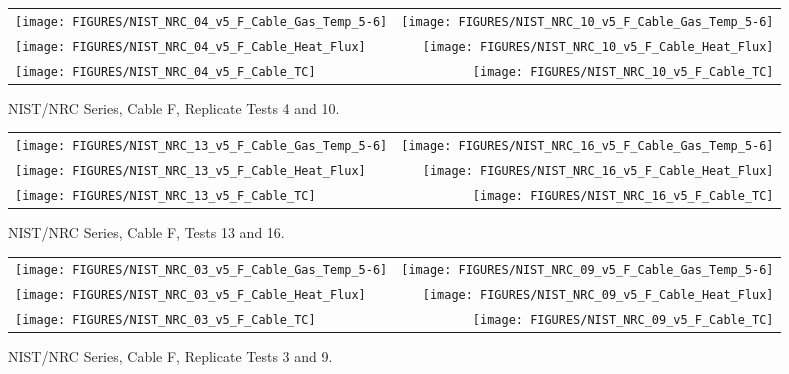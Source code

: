 \begin{figure}[h]
\begin{tabular*}{\textwidth}{l@{\extracolsep{\fill}}r}
\texttt{[image: FIGURES/NIST\_NRC\_04\_v5\_F\_Cable\_Gas\_Temp\_5-6]} &
\texttt{[image: FIGURES/NIST\_NRC\_10\_v5\_F\_Cable\_Gas\_Temp\_5-6]} \\
\texttt{[image: FIGURES/NIST\_NRC\_04\_v5\_F\_Cable\_Heat\_Flux]} &
\texttt{[image: FIGURES/NIST\_NRC\_10\_v5\_F\_Cable\_Heat\_Flux]} \\
\texttt{[image: FIGURES/NIST\_NRC\_04\_v5\_F\_Cable\_TC]} &
\texttt{[image: FIGURES/NIST\_NRC\_10\_v5\_F\_Cable\_TC]}
\end{tabular*}
\caption{NIST/NRC Series, Cable F, Replicate Tests 4 and 10.}
\label{NIST_NRC_F_4_and_10}
\end{figure}

\begin{figure}[h]
\begin{tabular*}{\textwidth}{l@{\extracolsep{\fill}}r}
\texttt{[image: FIGURES/NIST\_NRC\_13\_v5\_F\_Cable\_Gas\_Temp\_5-6]} &
\texttt{[image: FIGURES/NIST\_NRC\_16\_v5\_F\_Cable\_Gas\_Temp\_5-6]} \\
\texttt{[image: FIGURES/NIST\_NRC\_13\_v5\_F\_Cable\_Heat\_Flux]} &
\texttt{[image: FIGURES/NIST\_NRC\_16\_v5\_F\_Cable\_Heat\_Flux]} \\
\texttt{[image: FIGURES/NIST\_NRC\_13\_v5\_F\_Cable\_TC]} &
\texttt{[image: FIGURES/NIST\_NRC\_16\_v5\_F\_Cable\_TC]}
\end{tabular*}
\caption{NIST/NRC Series, Cable F, Tests 13 and 16.}
\label{NIST_NRC_F_13_and_16}
\end{figure}

\begin{figure}[h]
\begin{tabular*}{\textwidth}{l@{\extracolsep{\fill}}r}
\texttt{[image: FIGURES/NIST\_NRC\_03\_v5\_F\_Cable\_Gas\_Temp\_5-6]} &
\texttt{[image: FIGURES/NIST\_NRC\_09\_v5\_F\_Cable\_Gas\_Temp\_5-6]} \\
\texttt{[image: FIGURES/NIST\_NRC\_03\_v5\_F\_Cable\_Heat\_Flux]} &
\texttt{[image: FIGURES/NIST\_NRC\_09\_v5\_F\_Cable\_Heat\_Flux]} \\
\texttt{[image: FIGURES/NIST\_NRC\_03\_v5\_F\_Cable\_TC]} &
\texttt{[image: FIGURES/NIST\_NRC\_09\_v5\_F\_Cable\_TC]}
\end{tabular*}
\caption{NIST/NRC Series, Cable F, Replicate Tests 3 and 9.}
\label{NIST_NRC_F_3_and_9}
\end{figure}

